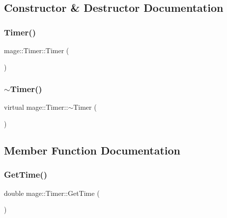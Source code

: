 \subsection{Constructor \& Destructor Documentation}
\hypertarget{classmage_1_1_timer_a5e1c0a3bb4491b3a43ce05874ad24055}{}\label{classmage_1_1_timer_a5e1c0a3bb4491b3a43ce05874ad24055} 
\subsubsection{\texorpdfstring{Timer()}{Timer()}}
{\footnotesize\ttfamily mage\+::\+Timer\+::\+Timer (\begin{DoxyParamCaption}{ }\end{DoxyParamCaption})}

\hypertarget{classmage_1_1_timer_aa91cebe8c59c189fde93932fde10265c}{}\label{classmage_1_1_timer_aa91cebe8c59c189fde93932fde10265c} 
\subsubsection{\texorpdfstring{$\sim$\+Timer()}{~Timer()}}
{\footnotesize\ttfamily virtual mage\+::\+Timer\+::$\sim$\+Timer (\begin{DoxyParamCaption}{ }\end{DoxyParamCaption})\hspace{0.3cm}{\ttfamily [virtual]}}



\subsection{Member Function Documentation}
\hypertarget{classmage_1_1_timer_ab6ae538071bb62bdf86de5344788c124}{}\label{classmage_1_1_timer_ab6ae538071bb62bdf86de5344788c124} 
\subsubsection{\texorpdfstring{Get\+Time()}{GetTime()}}
{\footnotesize\ttfamily double mage\+::\+Timer\+::\+Get\+Time (\begin{DoxyParamCaption}{ }\end{DoxyParamCaption})\hspace{0.3cm}{\ttfamily [private]}}

